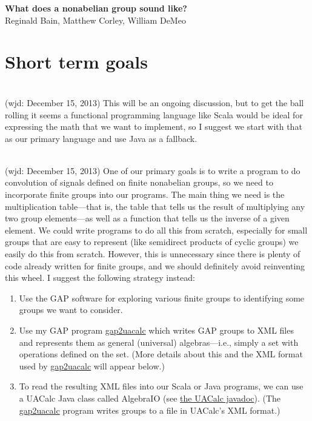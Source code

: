\documentclass[11pt]{article}
\begin{document}
\begin{center}
{\bf What does a nonabelian group sound like?}\\
Reginald Bain, Matthew Corley, William DeMeo
\end{center}

\section{Short term goals}

\\[5pt] (wjd: December 15, 2013)
This will be an ongoing discussion, but to get the ball rolling it seems a
functional programming language like Scala would be ideal for expressing the
math that we want to implement, so I suggest we start with that as our primary
language and use Java as a fallback.  

\vskip5mm

\\[5pt] (wjd: December 15, 2013)
One of our primary goals is to write a program to do convolution of signals
defined on finite nonabelian groups, so we need to incorporate finite
groups into our programs.  
The main thing we need is the multiplication table---that is, the table that
tells us the result of multiplying any two group elements---as well as
a function that tells us the inverse of a given element.
We could write programs to do all this from scratch, especially for small groups
that are easy to represent (like semidirect products of cyclic groups) we easily
do this from scratch. 
However, this is unnecessary since there is plenty of code already written for
finite groups, and we should definitely avoid reinventing this wheel.
I suggest the following strategy instead:
\begin{enumerate}
\item Use the \acs{GAP} software for exploring various finite groups to
  identifying some groups we want to consider.
\item Use my \acs{GAP} program
  \href{http://universalalgebra.wordpress.com/documentation/gap/gap-and-uacalc/}{gap2uacalc}
  which writes \acs{GAP} groups to \acs{XML} files and represents them as general (universal)
  algebras---i.e., simply a set with operations defined on the set. 
  (More details about this and the \acs{XML} format used by 
\href{http://universalalgebra.wordpress.com/documentation/gap/gap-and-uacalc/}{gap2uacalc}
 will appear below.)
\item To read the resulting \acs{XML} files into our Scala or Java programs,
  we can use a UACalc Java class called AlgebraIO 
  (see \href{http://uacalc.org/doc/}{the UACalc javadoc}). (The
  \href{http://universalalgebra.wordpress.com/documentation/gap/gap-and-uacalc/}{gap2uacalc}
  program writes groups to a file in UACalc's \acs{XML} format.)
\end{enumerate}
\end{document}
